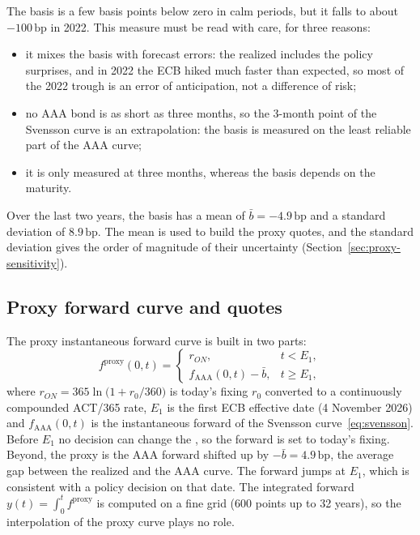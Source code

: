 \documentclass[11pt,a4paper]{article}
\theoremstyle{plain}
\theoremstyle{definition}
\newcommand{\bp}{\,\mathrm{bp}}
\newcommand{\estr}{\text{\texteuro STR}}
\begin{document}
The basis is a few basis points below zero in calm periods, but it falls to about $-100\bp$ in 2022. This measure must be read with care, for three reasons:
\begin{itemize}
    \item it mixes the basis with forecast errors: the realized \estr{} includes the policy surprises, and in 2022 the ECB hiked much faster than expected, so most of the 2022 trough is an error of anticipation, not a difference of risk;
    \item no AAA bond is as short as three months, so the 3-month point of the Svensson curve is an extrapolation: the basis is measured on the least reliable part of the AAA curve;
    \item it is only measured at three months, whereas the basis depends on the maturity.
\end{itemize}
Over the last two years, the basis has a mean of $\bar b=-4.9\bp$ and a standard deviation of $8.9\bp$. The mean is used to build the proxy quotes, and the standard deviation gives the order of magnitude of their uncertainty (Section~\ref{sec:proxy-sensitivity}).

\subsection{Proxy forward curve and quotes}

The proxy instantaneous forward curve is built in two parts:
\begin{equation}
    f^{\mathrm{proxy}}(0,t)=
    \begin{cases}
        r_{ON}, & t<E_1,\\[1mm]
        f_{\mathrm{AAA}}(0,t)-\bar b, & t\ge E_1,
    \end{cases}
    \label{eq:proxy-fwd}
\end{equation}
where $r_{ON}=365\ln\bigl(1+r_0/360\bigr)$ is today's \estr{} fixing $r_0$ converted to a continuously compounded ACT/365 rate, $E_1$ is the first ECB effective date (4 November 2026) and $f_{\mathrm{AAA}}(0,t)$ is the instantaneous forward of the Svensson curve~\eqref{eq:svensson}. Before $E_1$ no decision can change the \estr{}, so the forward is set to today's fixing. Beyond, the proxy is the AAA forward shifted up by $-\bar b=4.9\bp$, the average gap between the realized \estr{} and the AAA curve. The forward jumps at $E_1$, which is consistent with a policy decision on that date. The integrated forward $y(t)=\int_0^tf^{\mathrm{proxy}}$ is computed on a fine grid (600 points up to 32 years), so the interpolation of the proxy curve plays no role.
\end{document}
